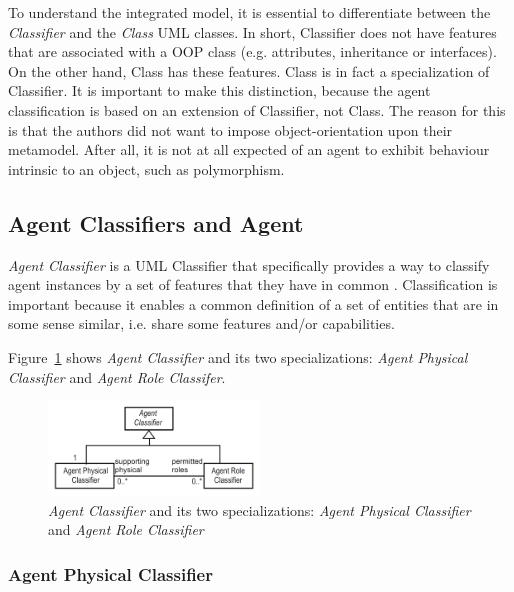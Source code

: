 To understand the integrated model, it is essential to differentiate between the \textit{Classifier} and the \textit{Class} UML classes.
In short, Classifier does not have features that are associated with a OOP class (e.g. attributes, inheritance or interfaces).
On the other hand, Class has these features.
Class is in fact a specialization of Classifier.
It is important to make this distinction, because the agent classification is based on an extension of Classifier, not Class.
The reason for this is that the authors did not want to impose object-orientation upon their metamodel.
After all, it is not at all expected of an agent to exhibit behaviour intrinsic to an object, such as polymorphism. 

\subsection{Agent Classifiers and Agent}

\textit{Agent Classifier} is a UML Classifier that specifically provides a way to classify agent instances by a set of features that they have in common \cite{Odell05}.
Classification is important because it enables a common definition of a set of entities that are in some sense similar, i.e. share some features and/or capabilities.

Figure~\ref{figure:onp-agent-classifiers} shows \textit{Agent Classifier} and its two specializations: \textit{Agent Physical Classifier} and \textit{Agent Role Classifer}.

\begin{figure}[ht]
	\centering
	\includegraphics[width=0.5\textwidth]{images/onp/agent-classifiers.png}
	\caption{\textit{Agent Classifier} and its two specializations: \textit{Agent Physical Classifier} and \textit{Agent Role Classifier} \cite{Odell05}}
	\label{figure:onp-agent-classifiers}
\end{figure}

\subsubsection*{Agent Physical Classifier}

